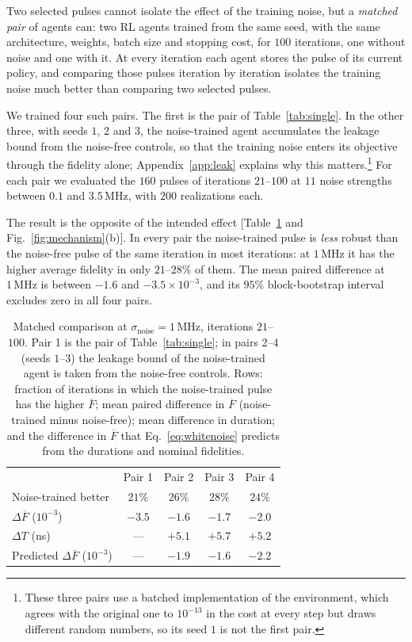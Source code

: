 \documentclass[aps,prx,twocolumn,superscriptaddress,nofootinbib,amsmath,amssymb,floatfix]{revtex4-2}
\newcommand{\Fbar}{\overline{F}}
\newcommand{\snoise}{\sigma_{\mathrm{noise}}}
\newcommand{\MHz}{\,\mathrm{MHz}}
\begin{document}
Two selected pulses cannot isolate the effect of the training noise, but a \emph{matched pair} of agents
can: two RL agents trained from the same seed, with the same architecture, weights, batch size and
stopping cost, for $100$ iterations, one without noise and one with it. At every iteration each agent
stores the pulse of its current policy, and comparing those pulses iteration by iteration isolates the
training noise much better than comparing two selected pulses.

We trained four such pairs. The first is the pair of Table~\ref{tab:single}. In the other three, with
seeds $1$, $2$ and $3$, the noise-trained agent accumulates the leakage bound from the noise-free
controls, so that the training noise enters its objective through the fidelity alone;
Appendix~\ref{app:leak} explains why this matters.\footnote{These three pairs use a batched
implementation of the environment, which agrees with the original one to $10^{-13}$ in the cost at every
step but draws different random numbers, so its seed $1$ is not the first pair.} For each pair we
evaluated the $160$ pulses of iterations $21$--$100$ at $11$ noise strengths between $0.1$ and $3.5\MHz$,
with $200$ realizations each.

The result is the opposite of the intended effect [Table~\ref{tab:seeds} and
Fig.~\ref{fig:mechanism}(b)]. In every pair the noise-trained pulse is \emph{less} robust than the
noise-free pulse of the same iteration in most iterations: at $1\MHz$ it has the higher average fidelity
in only $21$--$28\%$ of them. The mean paired difference at $1\MHz$ is between $-1.6$ and
$-3.5\times10^{-3}$, and its $95\%$ block-bootstrap interval excludes zero in all four pairs.

\begin{table}[t]
\caption{Matched comparison at $\snoise=1\MHz$, iterations $21$--$100$. Pair 1 is the pair of
Table~\ref{tab:single}; in pairs 2--4 (seeds $1$--$3$) the leakage bound of the noise-trained agent is
taken from the noise-free controls. Rows: fraction of iterations in which the noise-trained pulse has the
higher $\Fbar$; mean paired difference in $\Fbar$ (noise-trained minus noise-free); mean difference in
duration; and the difference in $\Fbar$ that Eq.~\eqref{eq:whitenoise} predicts from the durations and
nominal fidelities.}
\label{tab:seeds}
\footnotesize
\begin{ruledtabular}
\begin{tabular}{lcccc}
 & Pair 1 & Pair 2 & Pair 3 & Pair 4\\
\colrule
Noise-trained better & $21\%$ & $26\%$ & $28\%$ & $24\%$\\
$\Delta\Fbar$ ($10^{-3}$) & $-3.5$ & $-1.6$ & $-1.7$ & $-2.0$\\
$\Delta T$ (ns) & --- & $+5.1$ & $+5.7$ & $+5.2$\\
Predicted $\Delta\Fbar$ ($10^{-3}$) & --- & $-1.9$ & $-1.6$ & $-2.2$\\
\end{tabular}
\end{ruledtabular}
\end{table}
\end{document}

